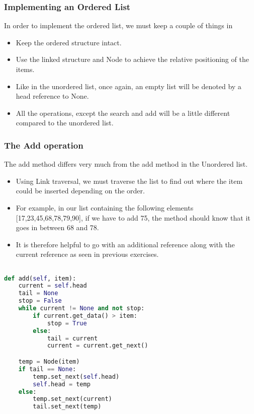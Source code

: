 \documentclass{beamer}
\begin{document}
\begin{frame}
\frametitle{Implementing an Ordered List}
In order to implement the ordered list, we must keep a couple of things in 

\begin{itemize}
\item Keep the ordered structure intact.
\item Use the linked structure and Node to achieve the relative positioning of the items.
\item Like in the unordered list, once again, an empty list will be denoted by a head reference to None.
\item All the operations, except the search and add will be a little different compared to the unordered list.
\end{itemize}
\end{frame}

\begin{frame}
\frametitle{The Add operation}
The add method differs very much from the add method in the Unordered list.

\begin{itemize}
\item Using Link traversal, we must traverse the list to find out where the item could be inserted depending on the order.

\item For example, in our list containing the following elements [17,23,45,68,78,79,90], if we have to add 75, the method should know that it goes in between 68 and 78.

\item It is therefore helpful to go with an additional reference along with the current reference as seen in previous exercises. 

\end{itemize}
\end{frame}
\begin{frame}[fragile]
\begin{lstlisting}[language=Python]

def add(self, item):
	current = self.head
	tail = None
	stop = False
	while current != None and not stop:
 		if current.get_data() > item:
 			stop = True
 		else:
			tail = current
			current = current.get_next()

	temp = Node(item)
	if tail == None:
		temp.set_next(self.head)
		self.head = temp
	else:
		temp.set_next(current)
		tail.set_next(temp)
\end{lstlisting}
\end{frame}
\end{document}
